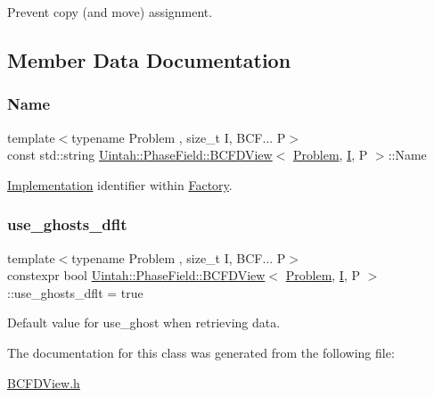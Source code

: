 Prevent copy (and move) assignment. 



\subsection{Member Data Documentation}
\mbox{\label{classUintah_1_1PhaseField_1_1BCFDView_accb8305fbad15fe1920987ce17148773}} 
\subsubsection{\texorpdfstring{Name}{Name}}
{\footnotesize\ttfamily template$<$typename Problem , size\+\_\+t I, B\+C\+F... P$>$ \\
const std\+::string \hyperlink{classUintah_1_1PhaseField_1_1BCFDView}{Uintah\+::\+Phase\+Field\+::\+B\+C\+F\+D\+View}$<$ \hyperlink{classUintah_1_1PhaseField_1_1Problem}{Problem}, \hyperlink{structUintah_1_1PhaseField_1_1I}{I}, P $>$\+::Name\hspace{0.3cm}{\ttfamily [static]}}



\hyperlink{classUintah_1_1PhaseField_1_1Implementation}{Implementation} identifier within \hyperlink{classUintah_1_1PhaseField_1_1Factory}{Factory}. 

\mbox{\label{classUintah_1_1PhaseField_1_1BCFDView_a7746f0ab792c1d5201e8917409fab236}} 
\subsubsection{\texorpdfstring{use\+\_\+ghosts\+\_\+dflt}{use\_ghosts\_dflt}}
{\footnotesize\ttfamily template$<$typename Problem , size\+\_\+t I, B\+C\+F... P$>$ \\
constexpr bool \hyperlink{classUintah_1_1PhaseField_1_1BCFDView}{Uintah\+::\+Phase\+Field\+::\+B\+C\+F\+D\+View}$<$ \hyperlink{classUintah_1_1PhaseField_1_1Problem}{Problem}, \hyperlink{structUintah_1_1PhaseField_1_1I}{I}, P $>$\+::use\+\_\+ghosts\+\_\+dflt = true\hspace{0.3cm}{\ttfamily [static]}}



Default value for use\+\_\+ghost when retrieving data. 



The documentation for this class was generated from the following file\+:\begin{DoxyCompactItemize}
\item 
\hyperlink{BCFDView_8h}{B\+C\+F\+D\+View.\+h}\end{DoxyCompactItemize}
